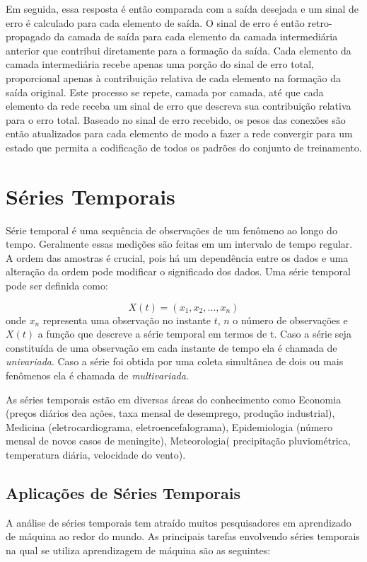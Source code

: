 Em seguida, essa resposta é então comparada com a saída desejada e um sinal de erro é calculado para cada elemento de saída. O sinal de erro é então retro-propagado da camada de saída para cada elemento da camada intermediária anterior que contribui diretamente para a formação da saída. Cada elemento da camada intermediária recebe apenas uma porção do sinal de erro total, proporcional apenas à contribuição relativa de cada elemento na formação da saída original. Este processo se repete, camada por camada, até que cada elemento da rede receba um sinal de erro que descreva sua contribuição relativa para o erro total. Baseado no sinal de erro recebido, os pesos das conexões são então atualizados para cada elemento de modo a fazer a rede convergir para um estado que permita a codificação de todos os padrões do conjunto de treinamento.

\section{Séries Temporais}

Série temporal é uma sequência de observações de um fenômeno ao longo do tempo. Geralmente essas medições são feitas em um intervalo de tempo regular. A ordem das amostras é crucial, pois há um dependência entre os dados e uma alteração da ordem pode modificar o significado dos dados. Uma série temporal pode ser definida como:

\begin{equation} \label{eq_TS}
X(t) = (x_1,x_2,...,x_n)
\end{equation}
onde $x_n$ representa uma observação no instante $t$, $n$ o número de observações e $X(t)$ a função que descreve a série temporal em termos de t. Caso a série seja constituída de uma observação em cada instante de tempo ela é chamada de \textit{univariada}. Caso a série foi obtida por uma coleta simultânea de dois ou mais fenômenos ela é chamada de \textit{multivariada}.

As séries temporais estão em diversas áreas do conhecimento como Economia (preços diários dea ações, taxa mensal de desemprego, produção industrial), Medicina (eletrocardiograma, eletroencefalograma), Epidemiologia (número mensal de novos casos de meningite), Meteorologia( precipitação pluviométrica, temperatura diária, velocidade do vento).

\subsection{Aplicações de Séries Temporais}
A análise de séries temporais tem atraído muitos pesquisadores em aprendizado de máquina ao redor do mundo. As principais tarefas envolvendo séries temporais na qual se utiliza aprendizagem de máquina são as seguintes:

